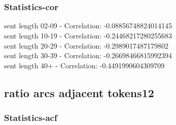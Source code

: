 \documentclass{article}%
\begin{document}
\begin{figure}[ht]%
\centering%
\setlength{\abovecaptionskip}{-35pt}%
%
%
\\%
%
%
\\%
%
\end{figure}

%
\newpage%
\subsubsection{Statistics{-}cor}%
\label{ssubsec:Statistics{-}cor}%
\noindent%
sent length 02-09 - Correlation: -0.08856748824014145\\%
sent length 10-19 - Correlation: -0.24468217280255683\\%
sent length 20-29 - Correlation: -0.2989017487179802\\%
sent length 30-39 - Correlation: -0.26698466815992394\\%
sent length 40+ - Correlation: -0.4491990604309709\\

%
\newpage

%
\subsection{ratio arcs adjacent tokens12}%
\label{subsec:ratioarcsadjacenttokens12}%
\subsubsection{Statistics{-}acf}%
\label{ssubsec:Statistics{-}acf}%
\end{document}
